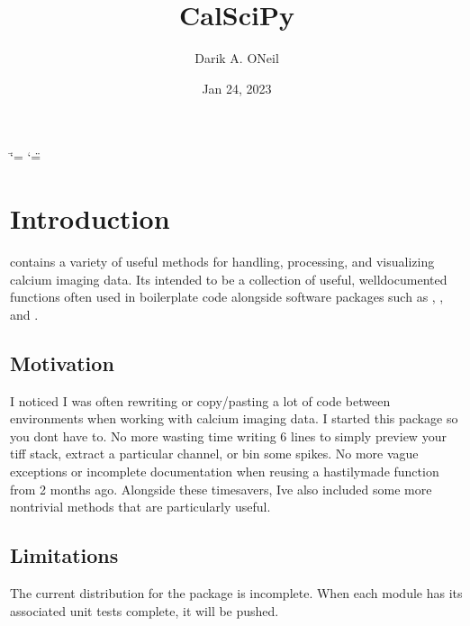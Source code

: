 \documentclass[letterpaper,10pt,english]{sphinxmanual}
\title{CalSciPy}
\date{Jan 24, 2023}
\author{Darik A.\@{} O\textquotesingle{}Neil}
\begin{document}
\ifdefined\shorthandoff
  \ifnum\catcode`\=\string=\active\shorthandoff{=}\fi
  \ifnum\catcode`\"=\active{}\fi
\fi

\pagestyle{empty}
\sphinxmaketitle
\pagestyle{plain}
\sphinxtableofcontents
\pagestyle{normal}
\label{\detokenize{index::doc}}


\sphinxstepscope


\chapter{Introduction}
\label{\detokenize{Introduction:introduction}}\label{\detokenize{Introduction::doc}}
\sphinxAtStartPar
{} contains a variety of useful methods for handling, processing, and visualizing calcium imaging data.
It\textquotesingle{}s intended to be a collection of useful, well\sphinxhyphen{}documented functions often used in boilerplate code alongside software
packages such as , ,
and .


\section{Motivation}
\label{\detokenize{Introduction:motivation}}
\sphinxAtStartPar
I noticed I was often re\sphinxhyphen{}writing or copy/pasting a lot of code between environments when working with calcium imaging
data. I started this package so you don\textquotesingle{}t have to. No more wasting time writing 6 lines to simply preview your tiff
stack, extract a particular channel, or bin some spikes. No more vague exceptions or incomplete documentation when re\sphinxhyphen{}using
a hastily\sphinxhyphen{}made function from 2 months ago. Alongside these time\sphinxhyphen{}savers, I\textquotesingle{}ve also included some more non\sphinxhyphen{}trivial methods
that are particularly useful.


\section{Limitations}
\label{\detokenize{Introduction:limitations}}
\sphinxAtStartPar
The current distribution for the package is incomplete. When each module has its associated unit tests complete, it will
be pushed.

\sphinxstepscope
\end{document}
